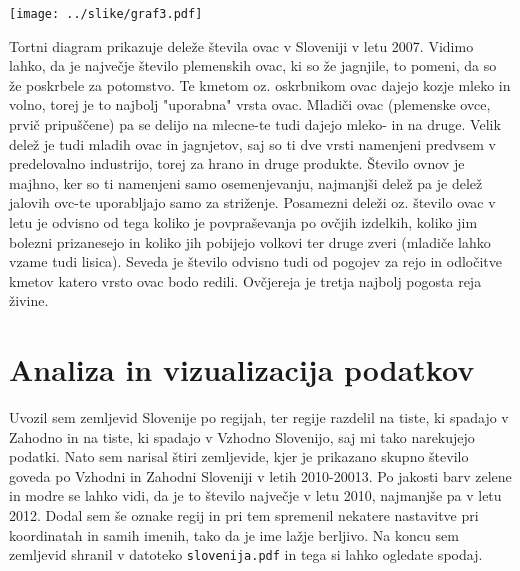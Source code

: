 \documentclass[11pt,a4paper]{article}
\begin{document}
\texttt{[image: ../slike/graf3.pdf]}

\noindent Tortni diagram prikazuje deleže števila ovac v Sloveniji v letu 2007. Vidimo lahko, da je največje število plemenskih ovac, ki so že jagnjile, to pomeni, da so že poskrbele za potomstvo. Te kmetom oz. oskrbnikom ovac dajejo kozje mleko in volno, torej je to najbolj "uporabna" vrsta ovac. Mladiči ovac (plemenske ovce, prvič pripuščene) pa se delijo na mlecne-te tudi dajejo mleko- in na druge. Velik delež je tudi mladih ovac in jagnjetov, saj so ti dve vrsti namenjeni predvsem v predelovalno industrijo, torej za hrano in druge produkte. Število ovnov je majhno, ker so ti namenjeni samo osemenjevanju, najmanjši delež pa je delež jalovih ovc-te uporabljajo samo za striženje. Posamezni deleži oz. število ovac v letu je odvisno od tega koliko je povpraševanja po ovčjih izdelkih, koliko jim bolezni prizanesejo in koliko jih pobijejo volkovi ter druge zveri (mladiče lahko vzame tudi lisica). Seveda je število odvisno tudi od pogojev za rejo in odločitve kmetov katero vrsto ovac bodo redili. Ovčjereja je tretja najbolj pogosta reja živine.


\newpage
\section{Analiza in vizualizacija podatkov}
Uvozil sem zemljevid Slovenije po regijah, ter regije razdelil na tiste, ki spadajo v Zahodno in na tiste, ki spadajo v Vzhodno Slovenijo, saj mi tako narekujejo podatki. Nato sem narisal štiri zemljevide, kjer je prikazano skupno število goveda po Vzhodni in Zahodni Sloveniji v letih 2010-20013. Po jakosti barv zelene in modre se lahko vidi, da je to število največje v letu 2010, najmanjše pa v letu 2012. Dodal sem še oznake regij in pri tem spremenil nekatere nastavitve pri koordinatah in samih imenih, tako da je ime lažje berljivo. Na koncu sem zemljevid shranil v datoteko \verb|slovenija.pdf| in tega si lahko ogledate spodaj.
\end{document}
